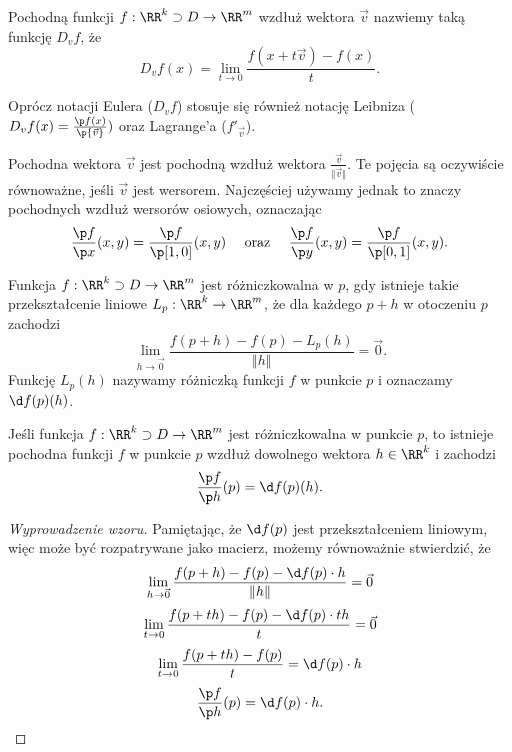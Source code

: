 \begin{definition}
    Pochodną funkcji $f : \RR^k \supset D \to \RR^m$ wzdłuż wektora $\vec{v}$ nazwiemy taką funkcję $D_v f$, że
    \[ D_v f(x) = \lim_{t\to 0}\frac{f(x + t\vec{v}) - f(x)}{t}. \]
\end{definition}

Oprócz notacji Eulera ($D_v f$) stosuje się również notację Leibniza ($D_v f(x) = \frac{\p f(x)}{\p{\vec{v}}})$ oraz  Lagrange'a ($f'_{\vec{v}}$).

Pochodna  wektora $\vec{v}$ jest pochodną wzdłuż wektora $\frac{\vec{v}}{\Vert\vec{v}\Vert}$. Te pojęcia są oczywiście równoważne, jeśli $\vec{v}$ jest wersorem. Najczęściej używamy jednak  to znaczy pochodnych wzdłuż wersorów osiowych, oznaczając
\[ \frac{\p f}{\p x}(x, y) = \frac{\p f}{\p [1, 0]}(x, y) \hspace{1em}\text{ oraz }\hspace{1em} \frac{\p f}{\p y}(x, y) = \frac{\p f}{\p [0, 1]}(x, y). \]

\begin{definition}[różniczka]
    Funkcja $f : \RR^k \supset D \to \RR^m$ jest różniczkowalna w $p$, gdy istnieje takie przekształcenie liniowe $L_{p} : \RR^k \to \RR^m$, że dla każdego $p + h$ w otoczeniu $p$ zachodzi
    \[ \lim_{h\to\vec{0}} \frac{f(p + h) - f(p) - L_{p}(h)}{\Vert h \Vert} = \vec{0}. \]
    Funkcję $L_{p}(h)$ nazywamy różniczką funkcji $f$ w punkcie $p$ i oznaczamy $\d f(p)(h)$.
\end{definition}

\begin{theorem}
    \label{t:differentiability implies derivability}
    Jeśli funkcja $f : \RR^k \supset D \to \RR^m$ jest różniczkowalna w punkcie $p$, to istnieje pochodna funkcji $f$ w punkcie $p$ wzdłuż dowolnego wektora $h \in \RR^k$ i zachodzi
    \[ \frac{\p f}{\p h}(p) = \d f(p)(h). \]
\end{theorem}
\begin{proof}[Wyprowadzenie wzoru]
    Pamiętając, że $\d f(p)$ jest przekształceniem liniowym, więc może być rozpatrywane jako macierz, możemy równoważnie stwierdzić, że
    \[ \lim_{h\to\vec{0}} \frac{f(p + h) - f(p) - \d f(p) \cdot h}{\Vert h \Vert} = \vec{0} \]
    \[ \lim_{t\to 0} \frac{f(p + th) - f(p) - \d f(p) \cdot th}{t} = \vec{0} \]
    \[ \lim_{t\to 0} \frac{f(p + th) - f(p)}{t} = \d f(p)\cdot h \]
    \[ \frac{\p f}{\p h}(p) = \d f(p)\cdot h. \]
\end{proof}

